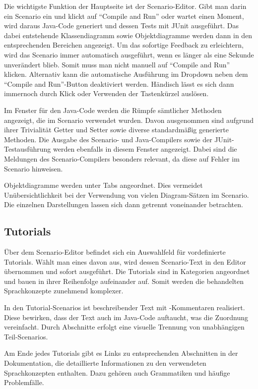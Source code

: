 Die wichtigste Funktion der Hauptseite ist der Scenario-Editor.
Gibt man darin ein Scenario ein und klickt auf ``Compile and Run'' oder wartet einen Moment,
wird daraus Java-Code generiert und dessen Tests mit JUnit ausgeführt.
Das dabei entstehende Klassendiagramm sowie Objektdiagramme werden dann in den entsprechenden Bereichen angezeigt.
Um das sofortige Feedback zu erleichtern, wird das Scenario immer automatisch ausgeführt, wenn es länger als eine Sekunde unverändert blieb.
Somit muss man nicht manuell auf ``Compile and Run'' klicken.
Alternativ kann die automatische Ausführung im Dropdown neben dem ``Compile and Run''-Button deaktiviert werden.
Händisch lässt es sich dann immernoch durch Klick oder Verwenden der Tastenkürzel auslösen.

Im Fenster für den Java-Code werden die Rümpfe sämtlicher Methoden angezeigt, die im Scenario verwendet wurden.
Davon ausgenommen sind aufgrund ihrer Trivialität Getter und Setter sowie diverse standardmäßig generierte Methoden.
Die Ausgabe des Scenario- und Java-Compilers sowie der JUnit-Testausführung werden ebenfalls in diesem Fenster angezeigt.
Dabei sind die Meldungen des Scenario-Compilers besonders relevant, da diese auf Fehler im Scenario hinweisen.

Objektdiagramme werden unter Tabs angeordnet.
Dies vermeidet Unübersichtlichkeit bei der Verwendung von vielen Diagram-Sätzen im Scenario.
Die einzelnen Darstellungen lassen sich dann getrennt voneinander betrachten.

\subsection{Tutorials}\label{subsec:tutorials}

Über dem Scenario-Editor befindet sich ein Auswahlfeld für vordefinierte Tutorials.
Wählt man eines davon aus, wird dessen Scenario-Text in den Editor übernommen und sofort ausgeführt.
Die Tutorials sind in Kategorien angeordnet und bauen in ihrer Reihenfolge aufeinander auf.
Somit werden die behandelten Sprachkonzepte zunehmend komplexer.

In den Tutorial-Scenarios ist beschreibender Text mit \code{//}-Kommentaren realisiert.
Diese bewirken, dass der Text auch im Java-Code auftaucht, was die Zuordnung vereinfacht.
Durch Abschnitte erfolgt eine visuelle Trennung von unabhängigen Teil-Scenarios.

Am Ende jedes Tutorials gibt es Links zu entsprechenden Abschnitten in der Dokumentation,
die detaillierte Informationen zu den verwendeten Sprachkonzepten enthalten.
Dazu gehören auch Grammatiken und häufige Problemfälle.

